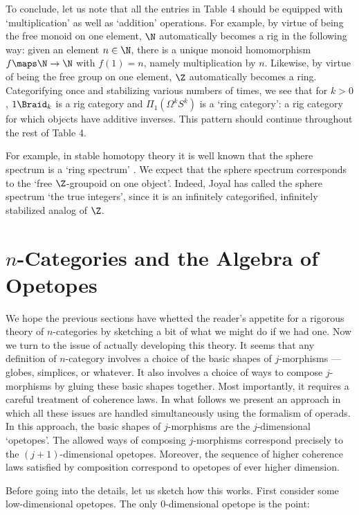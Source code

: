 To conclude, let us note that all the entries in Table 4 should be
equipped with `multiplication' as well as `addition' operations.  For
example, by virtue of being the free monoid on one element, $\N$
automatically becomes a rig in the following way: given an element $n
\in \N$, there is a unique monoid homomorphism $f \maps \N \to \N$ with
$f(1) = n$, namely multiplication by $n$.  Likewise, by virtue of being
the free group on one element, $\Z$ automatically becomes a ring.
Categorifying once and stabilizing various numbers of times, we see that
for $k > 0$, $1\Braid_k$ is a rig category and $\Pi_1(\Omega^k S^k)$ is
a `ring category': a rig category for which objects have additive
inverses.  This pattern should continue throughout the rest of Table 4.

For example, in stable homotopy theory it is well known that the sphere
spectrum is a `ring spectrum' \cite{MQRT}.  We expect that the sphere
spectrum corresponds to the `free $\Z$-groupoid on one object'.  Indeed,
Joyal has called the sphere spectrum `the true integers', since it is an
infinitely categorified, infinitely stabilized analog of $\Z$.

\section{$n$-Categories and the Algebra of Opetopes}   \label{opetopes}

We hope the previous sections have whetted the reader's appetite for a
rigorous theory of $n$-categories by sketching a bit of what we might do
if we had one.  Now we turn to the issue of actually developing this
theory.  It seems that any definition of $n$-category involves a choice
of the basic shapes of $j$-morphisms --- globes, simplices, or whatever.
It also involves a choice of ways to compose $j$-morphisms by gluing
these basic shapes together.  Most importantly, it requires a careful
treatment of coherence laws.  In what follows we present an approach in
which all these issues are handled simultaneously using the formalism of
operads.  In this approach, the basic shapes of $j$-morphisms are the
$j$-dimensional `opetopes'.  The allowed ways of composing $j$-morphisms
correspond precisely to the $(j+1)$-dimensional opetopes.  Moreover, the
sequence of higher coherence laws satisfied by composition correspond to
opetopes of ever higher dimension.

Before going into the details, let us sketch how this works.  First
consider some low-dimensional opetopes.  The only 0-dimensional opetope
is the point:


